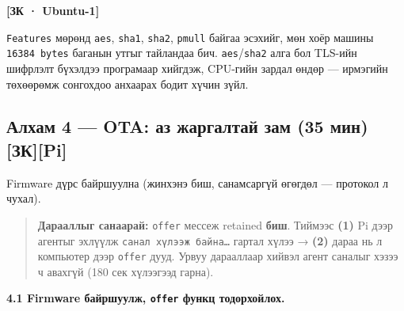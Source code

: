 \begin{Shaded}
\begin{Highlighting}[]
\OperatorTok{2\textgreater{}}\KeywordTok{|} 
\end{Highlighting}
\end{Shaded}

\textbf{{[}ЗК · Ubuntu-1{]}}

\begin{Shaded}
\begin{Highlighting}[]
\OperatorTok{2\textgreater{}}\KeywordTok{|} 
\end{Highlighting}
\end{Shaded}

\texttt{Features} мөрөнд \texttt{aes}, \texttt{sha1}, \texttt{sha2}, \texttt{pmull} байгаа эсэхийг, мөн хоёр машины \texttt{16384\ bytes} баганын утгыг тайландаа бич. \texttt{aes}/\allowbreak\texttt{sha2} алга бол TLS-ийн шифрлэлт бүхэлдээ програмаар хийгдэж, CPU-гийн зардал өндөр --- ирмэгийн төхөөрөмж сонгохдоо анхаарах бодит хүчин зүйл.

\hypertarget{ux430ux43bux445ux430ux43c-4-ota-ux430ux437-ux436ux430ux440ux433ux430ux43bux442ux430ux439-ux437ux430ux43c-35-ux43cux438ux43d-ux437ux43api}{%
\subsection{Алхам 4 --- OTA: аз жаргалтай зам (35 мин) {[}ЗК{]}{[}Pi{]}}\label{ux430ux43bux445ux430ux43c-4-ota-ux430ux437-ux436ux430ux440ux433ux430ux43bux442ux430ux439-ux437ux430ux43c-35-ux43cux438ux43d-ux437ux43api}}

Firmware дүрс байршуулна (жинхэнэ биш, санамсаргүй өгөгдөл --- протокол л чухал).

\begin{quote}
\textbf{Дарааллыг санаарай:} \texttt{offer} мессеж retained \textbf{биш}. Тиймээс \textbf{(1)} Pi дээр агентыг эхлүүлж \texttt{санал\ хүлээж\ байна\ldots{}} гартал хүлээ → \textbf{(2)} дараа нь л компьютер дээр \texttt{offer} дууд. Урвуу дарааллаар хийвэл агент саналыг хэзээ ч авахгүй (180 сек хүлээгээд гарна).
\end{quote}

\textbf{4.1 Firmware байршуулж, \texttt{offer} функц тодорхойлох.}

